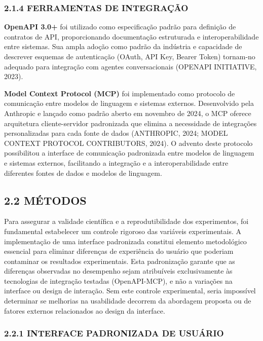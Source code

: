 \documentclass[
]{article}
\begin{document}
\subsubsection{2.1.4 FERRAMENTAS DE
INTEGRAÇÃO}\label{ferramentas-de-integrauxe7uxe3o}

\textbf{OpenAPI 3.0+} foi utilizado como especificação padrão para
definição de contratos de API, proporcionando documentação estruturada e
interoperabilidade entre sistemas. Sua ampla adoção como padrão da
indústria e capacidade de descrever esquemas de autenticação (OAuth, API
Key, Bearer Token) tornam-no adequado para integração com agentes
conversacionais (OPENAPI INITIATIVE, 2023).

\textbf{Model Context Protocol (MCP)} foi implementado como protocolo de
comunicação entre modelos de linguagem e sistemas externos. Desenvolvido
pela Anthropic e lançado como padrão aberto em novembro de 2024, o MCP
oferece arquitetura cliente-servidor padronizada que elimina a
necessidade de integrações personalizadas para cada fonte de dados
(ANTHROPIC, 2024; MODEL CONTEXT PROTOCOL CONTRIBUTORS, 2024). O advento
deste protocolo possibilitou a interface de comunicação padronizada
entre modelos de linguagem e sistemas externos, facilitando a integração
e a interoperabilidade entre diferentes fontes de dados e modelos de
linguagem.

\subsection{2.2 MÉTODOS}\label{muxe9todos}

Para assegurar a validade científica e a reprodutibilidade dos
experimentos, foi fundamental estabelecer um controle rigoroso das
variáveis experimentais. A implementação de uma interface padronizada
constitui elemento metodológico essencial para eliminar diferenças de
experiência do usuário que poderiam contaminar os resultados
experimentais. Esta padronização garante que as diferenças observadas no
desempenho sejam atribuíveis exclusivamente às tecnologias de integração
testadas (OpenAPI-MCP), e não a variações na interface ou design de
interação. Sem este controle experimental, seria impossível determinar
se melhorias na usabilidade decorrem da abordagem proposta ou de fatores
externos relacionados ao design da interface.

\subsubsection{2.2.1 INTERFACE PADRONIZADA DE
USUÁRIO}\label{interface-padronizada-de-usuuxe1rio}
\end{document}
